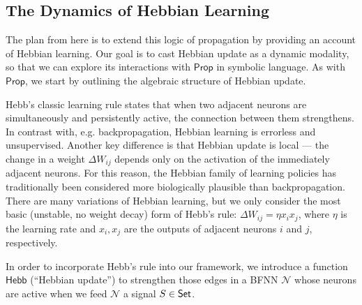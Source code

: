 \documentclass[letterpaper]{article}
\theoremstyle{definition}
\newtheorem{definition}{Definition}
\newcommand{\Set}{\mbox{\sf Set}}
\newcommand{\set}[1]{\{ #1 \}}
\newcommand*{\bigchi}{\mbox{\Large$\chi$}}%
\newcommand{\Prop}{\textsf{Prop}}
\newcommand{\Inc}{\textsf{Hebb}}
\newcommand{\Net}{\mathcal{N}}
\begin{document}
\subsection{The Dynamics of Hebbian Learning}

The plan from here is to extend this logic of propagation by providing an account of Hebbian learning.  Our goal is to cast Hebbian update as a dynamic modality, so that we can explore its interactions with $\Prop$ in symbolic language.  As with $\Prop$, we start by outlining the algebraic structure of Hebbian update.

Hebb's classic learning rule \citep{hebb-organization-of-behavior-1949} states that when two adjacent neurons are simultaneously and persistently active, the connection between them strengthens.  In contrast with, e.g. backpropagation, Hebbian learning is errorless and unsupervised.  Another key difference is that Hebbian update is local --- the change in a weight $\Delta W_{ij}$ depends only on the activation of the immediately adjacent neurons.  For this reason, the Hebbian family of learning policies has traditionally been considered more biologically plausible than backpropagation.  There are many variations of Hebbian learning, but we only consider the most basic (unstable, no weight decay) form of Hebb's rule:  $\Delta W_{ij} = \eta x_i x_j$, where $\eta$ is the learning rate and $x_i, x_j$ are the outputs of adjacent neurons $i$ and $j$, respectively.

In order to incorporate Hebb's rule into our framework, we introduce a function $\Inc$ (``Hebbian update'') to strengthen those edges in a BFNN $\Net$ whose neurons are active when we feed $\Net$ a signal $S \in \Set$.  
\end{document}
